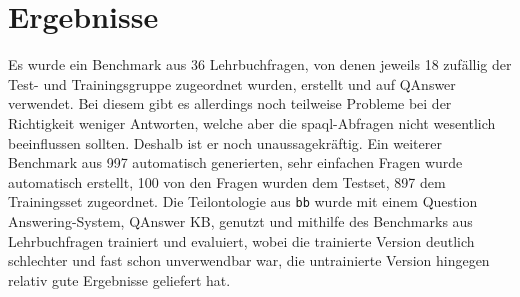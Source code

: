 \chapter{Ergebnisse}\label{ch:results}
Es wurde ein Benchmark aus 36 Lehrbuchfragen, von denen jeweils 18 zufällig der Test- und Trainingsgruppe zugeordnet wurden, erstellt und auf QAnswer verwendet.
Bei diesem gibt es allerdings noch teilweise Probleme bei der Richtigkeit weniger Antworten, welche aber die \ac{spaql}-Abfragen nicht wesentlich beeinflussen sollten.
Deshalb ist er noch unaussagekräftig.
Ein weiterer Benchmark aus 997 automatisch generierten, sehr einfachen Fragen wurde automatisch erstellt, 100 von den Fragen wurden dem Testset, 897 dem Trainingsset zugeordnet.
Die Teilontologie aus \texttt{bb} wurde mit einem Question Answering-System, QAnswer KB, genutzt und mithilfe des Benchmarks aus Lehrbuchfragen trainiert und evaluiert,
wobei die trainierte Version deutlich schlechter und fast schon unverwendbar war, die untrainierte Version hingegen relativ gute Ergebnisse geliefert hat.
